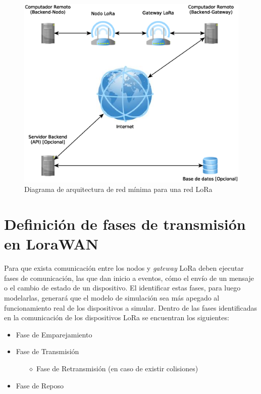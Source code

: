 \begin{justify}
\begin{figure}[!ht]
\includegraphics[scale=0.45]{diagramas/redminimalora.eps}
\caption{Diagrama de arquitectura de red mínima para una red LoRa}
\label{lora:arc}
\end{figure}
\newpage
\noindent
\section{Definición de fases de transmisión en LoraWAN}
Para que exista comunicación entre los nodos y \textit{gateway} LoRa deben ejecutar fases de comunicación, las que dan inicio a eventos, cómo el envío de un mensaje o el cambio de estado de un dispositivo. El identificar estas fases, para luego modelarlas, generará que el modelo de simulación sea más apegado al funcionamiento real de los dispositivos a simular. Dentro de las fases identificadas en la comunicación de los dispositivos LoRa se encuentran los siguientes:
\begin{itemize}
\item Fase de Emparejamiento
\item Fase de Transmisión
\begin{itemize}
\item[$\diamond$] Fase de Retransmisión (en caso de existir colisiones)
\end{itemize}
\item Fase de Reposo
\end{itemize}


\end{justify}
